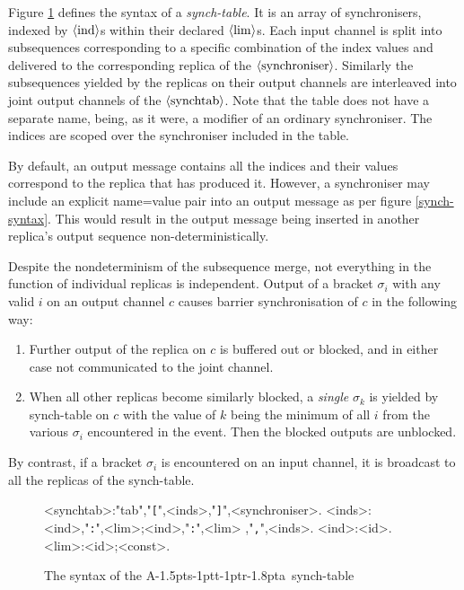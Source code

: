 \documentclass[11pt]{report}
\def\ak{{\textsf{A\kern-1.5pts\kern-1ptt\kern-1ptr\kern-1.8pta}}\kern-2pt{\it K\kern-2ptahn}}
\begin{document}
Figure \ref{synchtab-syntax} defines the syntax of a {\em synch-table}. It is an array of synchronisers, indexed by $\langle{\rm ind}\rangle$s within their declared $\langle{\rm lim}\rangle$s. Each input channel is split into subsequences corresponding to a specific  combination of the index values and delivered to the corresponding replica of the $\langle{\rm synchroniser}\rangle$. Similarly the subsequences yielded by the replicas on their output channels are interleaved into joint output channels of the $\langle{\rm synchtab}\rangle$. Note that the table does not have a separate name, being, as it were, a modifier of an ordinary synchroniser. The indices are scoped over the synchroniser included in the table.

By default, an output message contains all the indices and their values correspond to the replica that has produced it. However, a synchroniser may include an explicit name=value pair into an output message as per figure \ref{synch-syntax}. This would result in the output message being inserted in another replica's output sequence non-deterministically.

Despite the nondeterminism of the subsequence merge, not everything in the function of individual replicas is independent.
Output of a bracket $\sigma_i$ with any valid $i$ on an output channel $c$ causes barrier synchronisation of $c$ in the following way:
\begin{enumerate}
\item Further output of the replica on $c$ is buffered out or blocked, and in either case not communicated to the joint channel.
\item When all other replicas become similarly blocked, a {\em single} $\sigma_k$ is yielded by synch-table on $c$ with the value of $k$ being the minimum of all $i$ from the various $\sigma_i$ encountered in the event. Then the blocked outputs are unblocked.
\end{enumerate}
By contrast, if a bracket $\sigma_i$ is encountered on an input channel, it is broadcast to all the replicas of the synch-table.

\begin{figure}
\begin{framed}
\begin{grammar}
<synchtab>:"tab","{\tt [}",<inds>,"{\tt ]}",<synchroniser>.
<inds>:<ind>,"{\tt :}",<lim>;<ind>,"{\tt :}",<lim> ,"{\tt,}",<inds>.
<ind>:<id>.
<lim>:<id>;<const>.
\end{grammar}
\end{framed}
\caption{The syntax of the \ak\ synch-table\label{synchtab-syntax}}
\end{figure}
\end{document}
